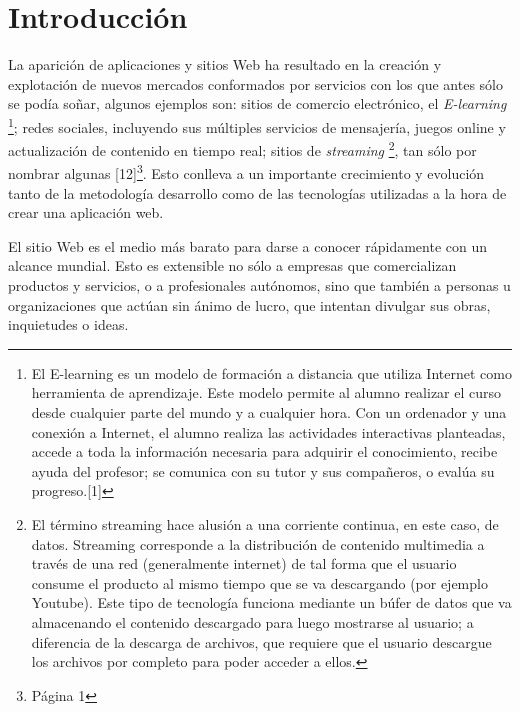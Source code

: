 \section{Introducción}

La aparición de aplicaciones y sitios Web ha resultado en la creación y explotación de nuevos 
mercados conformados por servicios con los que antes sólo se podía soñar, algunos ejemplos son: sitios de 
comercio electrónico, el \textit{E-learning} 
\footnote{El E-learning es un modelo de formación a distancia que utiliza Internet como herramienta de aprendizaje. 
Este modelo permite al alumno realizar el curso desde cualquier parte del mundo y a cualquier hora.
Con un ordenador y una conexión a Internet, el alumno realiza las actividades interactivas planteadas, accede a toda 
la información necesaria para adquirir el conocimiento, recibe ayuda del profesor; se comunica con su tutor y sus compañeros, o 
evalúa su progreso.[1]}; redes sociales, incluyendo sus múltiples servicios de mensajería, juegos online y actualización 
de contenido en tiempo real; sitios de \textit{streaming} 
\footnote{El término streaming hace alusión a una corriente continua, en este caso, de datos.
Streaming corresponde a  la distribución de contenido multimedia a través de una red (generalmente internet)
de tal forma que el usuario consume el producto al mismo tiempo que se va descargando (por ejemplo Youtube). 
Este tipo de tecnología funciona mediante un búfer de datos que va almacenando el contenido descargado para 
luego mostrarse al usuario; a diferencia de la descarga de archivos, que requiere que el usuario descargue los 
archivos por completo para poder acceder a ellos.}, tan sólo por nombrar algunas [12]\footnote{Página 1}. Esto conlleva a un importante 
crecimiento y evolución tanto de la metodología desarrollo como de las tecnologías utilizadas a la hora de crear 
una aplicación web.


El sitio Web es el medio más barato para darse a conocer rápidamente con un alcance mundial. 
Esto es extensible no sólo a empresas que comercializan productos y servicios, o a profesionales 
autónomos, sino que también a personas u organizaciones que actúan sin ánimo de lucro, que intentan
divulgar sus obras, inquietudes o ideas.

